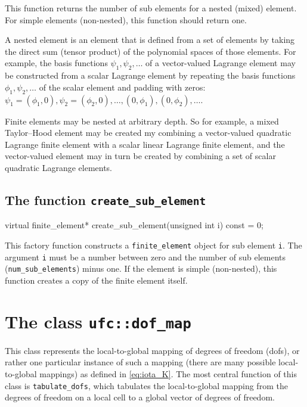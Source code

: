 This function returns the number of sub elements for a nested (mixed)
element. For simple elements (non-nested), this function should return
one.

A nested element is an element that is defined from a set of elements
by taking the direct sum (tensor product) of the polynomial spaces of
those elements. For example, the basis functions $\psi_1, \psi_2,
\ldots$ of a vector-valued Lagrange element may be constructed from a
scalar Lagrange element by repeating the basis functions $\phi_1,
\psi_2, \ldots$ of the scalar element and padding with zeros: $\psi_1
= (\phi_1, 0), \psi_2 = (\phi_2, 0), \ldots, (0, \phi_1), (0, \phi_2),
\ldots$.

Finite elements may be nested at arbitrary depth. So for example, a
mixed Taylor--Hood element may be created my combining a vector-valued
quadratic Lagrange finite element with a scalar linear Lagrange finite
element, and the vector-valued element may in turn be created by
combining a set of scalar quadratic Lagrange elements.

\subsection{The function \texttt{create\_sub\_element}}

\begin{code}
virtual finite_element* create_sub_element(unsigned int i) const = 0;
\end{code}

This factory function constructs a \texttt{finite\_element} object for
sub element \texttt{i}. The argument \texttt{i} must be a number
between zero and the number of sub elements
(\texttt{num\_sub\_elements}) minus one. If the element is simple
(non-nested), this function creates a copy of the finite element
itself.

\section{The class \texttt{ufc::dof\_map}}

This class represents the local-to-global mapping of degrees of
freedom (dofs), or rather one particular instance of such a mapping
(there are many possible local-to-global mappings) as defined in
\eqref{eq:iota_K}.  The most central function of this class is
\texttt{tabulate\_dofs}, which tabulates the local-to-global mapping
from the degrees of freedom on a local cell to a global vector of
degrees of freedom.

